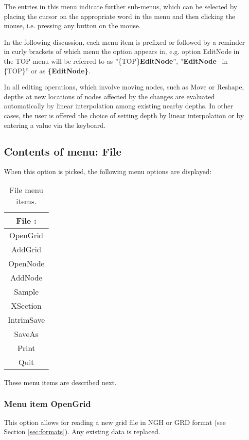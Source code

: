 \documentclass{article}
\begin{document}
The entries in this menu indicate further sub-menus, which can be selected by placing the cursor on the appropriate word in the menu and then clicking the mouse, i.e. pressing any button on the mouse.

In the following discussion, each menu item is prefixed or followed by a reminder in curly brackets of which menu the option appears in, e.g. option EditNode in the TOP menu will be referred to as ''\{TOP\}\textbf{EditNode{}}'', ''\textbf{EditNode} \ in \{TOP\}'' or as \textbf{\{EditNode\}}.

In all editing operations, which involve moving nodes, such as Move or Reshape, depths at new locations of nodes affected by the changes are evaluated automatically by linear interpolation among existing nearby depths. In other cases, the user is offered the choice of setting depth by linear interpolation or by entering a value via the keyboard.

\subsection{Contents of menu: File}
When this option is picked, the following menu options are displayed:

\begin{table}[htb!]
 \caption{File menu items.}
  \begin{center}
   \begin{tabular}{|c|}
    \hline
File :\\     \hline
OpenGrid \\ AddGrid \\     \hline
OpenNode \\ AddNode \\    \hline
Sample \\    \hline
XSection \\    \hline
IntrimSave \\ SaveAs \\    \hline
Print \\ Quit\\
    \hline
   \end{tabular}
   \label{tab:FILE}
  \end{center}
\end{table}

These menu items are described next.

\subsubsection[Menu item OpenGrid]{Menu item OpenGrid}
This option allows for reading a new grid file in NGH or GRD format (see Section \ref{sec:formats}). Any existing data is replaced.
\end{document}

